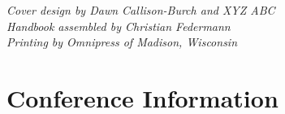 \documentclass[twoside,makeidx]{book}
\begin{document}


\fancyfoot[C]{}




\thispagestyle{empty}
\vspace*{6in}
\noindent\emph{Cover design by Dawn Callison-Burch and XYZ ABC}\\
\noindent\emph{Handbook assembled by Christian Federmann}\\
\emph{Printing by Omnipress of Madison, Wisconsin}

\newpage
\cleardoublepage
\fancyfoot[C]{\thepage}
\frontmatter





\setcounter{tocdepth}{2}
\tableofcontents
\mainmatter
\pagestyle{fancy}


\clearpage


\chapter{Conference Information}


\clearpage


\clearpage%
\setheaders{}{}


%
\clearpage%
\setheaders{}{}
\end{document}
